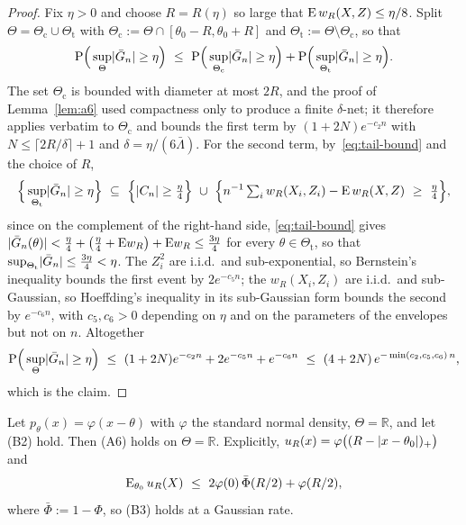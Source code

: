 \begin{proof}
Fix $\eta>0$ and choose $R=R(\eta)$ so large that $\mathrm{E}\,w_R(X,Z)\le\eta/8$. Split $\Theta=\Theta_{\mathrm{c}}\cup\Theta_{\mathrm{t}}$ with $\Theta_{\mathrm{c}}:=\Theta\cap[\theta_0-R,\theta_0+R]$ and $\Theta_{\mathrm{t}}:=\Theta\setminus\Theta_{\mathrm{c}}$, so that
$$
\mathrm{P}\Big(\sup_{\Theta}\lvert\bar G_n\rvert\ge\eta\Big)\ \le\ \mathrm{P}\Big(\sup_{\Theta_{\mathrm{c}}}\lvert\bar G_n\rvert\ge\eta\Big)+\mathrm{P}\Big(\sup_{\Theta_{\mathrm{t}}}\lvert\bar G_n\rvert\ge\eta\Big).
$$
The set $\Theta_{\mathrm{c}}$ is bounded with diameter at most $2R$, and the proof of Lemma~\ref{lem:a6} used compactness only to produce a finite $\delta$-net; it therefore applies verbatim to $\Theta_{\mathrm{c}}$ and bounds the first term by $(1+2N)e^{-c_2 n}$ with $N\le\lceil 2R/\delta\rceil+1$ and $\delta=\eta/(6\bar\Lambda)$. For the second term, by~\eqref{eq:tail-bound} and the choice of $R$,
$$
\Big\{\sup_{\Theta_{\mathrm{t}}}\abs{\bar G_n}\ge\eta\Big\}\ \subseteq\ \Big\{\abs{C_n}\ge\tfrac{\eta}{4}\Big\}\ \cup\ \Big\{n^{-1}\textstyle\sum_{i}w_R(X_i,Z_i)-\E\,w_R(X,Z)\ \ge\ \tfrac{\eta}{4}\Big\},
$$
since on the complement of the right-hand side, \eqref{eq:tail-bound} gives $\lvert\bar G_n(\theta)\rvert<\tfrac{\eta}{4}+\big(\tfrac{\eta}{4}+\mathrm{E} w_R\big)+\mathrm{E} w_R\le\tfrac{3\eta}{4}$ for every $\theta\in\Theta_{\mathrm{t}}$, so that $\sup_{\Theta_{\mathrm{t}}}\lvert\bar G_n\rvert\le\tfrac{3\eta}{4}<\eta$. The $Z_i^2$ are i.i.d.\ and sub-exponential, so Bernstein's inequality bounds the first event by $2e^{-c_5 n}$; the $w_R(X_i,Z_i)$ are i.i.d.\ and sub-Gaussian, so Hoeffding's inequality in its sub-Gaussian form \cite{Vershynin2018} bounds the second by $e^{-c_6 n}$, with $c_5,c_6>0$ depending on $\eta$ and on the parameters of the envelopes but not on $n$. Altogether
$$
\Prob\Big(\sup_{\Theta}\abs{\bar G_n}\ge\eta\Big)\ \le\ (1+2N)e^{-c_2 n}+2e^{-c_5 n}+e^{-c_6 n}\ \le\ (4+2N)\,e^{-\min(c_2,c_5,c_6)\,n},
$$
which is the claim.
\end{proof}

\begin{corollary}
\label{cor:a6-normal}
Let $p_\theta(x)=\varphi(x-\theta)$ with $\varphi$ the standard normal density, $\Theta=\mathbb{R}$, and let (B2) hold. Then (A6) holds on $\Theta=\mathbb{R}$. Explicitly, $u_R(x)=\varphi\big((R-\lvert x-\theta_0\rvert)_+\big)$ and
$$
\E_{\theta_0}\,u_R(X)\ \le\ 2\varphi(0)\,\bar\Phi(R/2)+\varphi(R/2),
$$
where $\bar\Phi:=1-\Phi$, so (B3) holds at a Gaussian rate.
\end{corollary}

